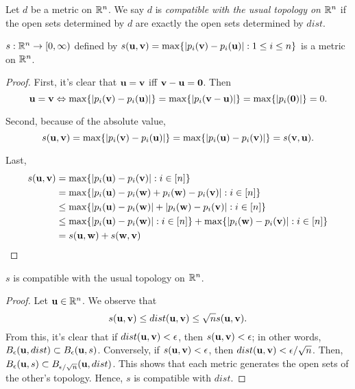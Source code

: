 \documentclass[letterpaper, twoside, 12pt]{book}
\begin{document}
\begin{definition}
  Let \(d\) be a metric on \(\mathbb R^n\). We say \(d\) is \textit{compatible
  with the usual topology on \(\mathbb R^n\)} if the open sets determined by
  \(d\) are exactly the open sets determined by \(dist\).
\end{definition}


\begin{example}
  \(s:\mathbb R^n\to[0,\infty)\) defined by
  \(s(\mathbf u,\mathbf v)=\max\{|p_i(\mathbf v)-p_i(\mathbf u)|:1\leq i\leq n\}\)
  is a metric on \(\mathbb R^n\).
\end{example}

\begin{proof}
    First, it's clear that \(\mathbf u = \mathbf v\) iff \(\mathbf v - \mathbf u = \mathbf 0\). Then
    \[ \mathbf u = \mathbf v \Leftrightarrow \max\{ |p_i(\mathbf v) - p_i(\mathbf u)|\} = 
    \max\{ |p_i(\mathbf v - \mathbf u)|\} = \max\{ |p_i(\mathbf 0)|\} = 0 .\]
    
    Second, because of the absolute value, 
    \[ s(\mathbf u, \mathbf v) = \max\{ |p_i(\mathbf v) - p_i(\mathbf u)| \} = 
    \max \{ |p_i(\mathbf u) - p_i(\mathbf v)|\} = s(\mathbf v, \mathbf u) .\]

    Last,
    \begin{align*}
        s(\mathbf u, \mathbf v) &= \max\{|p_i(\mathbf u) - p_i(\mathbf v)| : i \in [n] \} \\
                            &= \max\{|p_i(\mathbf u) - p_i(\mathbf w) + p_i(\mathbf w) - p_i(\mathbf v)| : i \in [n] \} \\
                            &\leq \max\{ |p_i(\mathbf u) - p_i(\mathbf w)| + |p_i(\mathbf w) - p_i(\mathbf v)| : i \in [n] \} \\
                            &\leq \max\{ |p_i(\mathbf u) - p_i(\mathbf w)| : i \in [n] \} + \max\{ |p_i(\mathbf w) - p_i(\mathbf v)| : i \in [n] \} \\
                            &= s(\mathbf u, \mathbf w) + s(\mathbf w, \mathbf v) \\
    \end{align*}
\end{proof}

\begin{theorem}
  \(s\) is compatible with the usual topology on \(\mathbb R^n\).
\end{theorem}

\begin{proof}
    Let \(\mathbf u \in \mathbb R^n\). We observe that
    \[ s(\mathbf u, \mathbf v) \leq dist(\mathbf u, \mathbf v) \leq \sqrt{n} s(\mathbf u, \mathbf v) .\]
    From this, it's clear that if \(dist(\mathbf u, \mathbf v) < \epsilon\), then 
    \(s(\mathbf u, \mathbf v) < \epsilon\); in other words, \(B_{\epsilon}(\mathbf u, dist) \subset B_{\epsilon}(\mathbf u, s)\).
    Conversely, if \(s(\mathbf u, \mathbf v) < \epsilon\), then 
    \(dist(\mathbf u, \mathbf v) < \epsilon / \sqrt{n} \). Then, 
    \( B_{\epsilon}(\mathbf u, s) \subset B_{\epsilon / \sqrt{n}}(\mathbf u, dist) \).
    This shows that each metric generates the open sets of the other's topology. Hence,
    \(s\) is compatible with \(dist\).
\end{proof}
\end{document}
